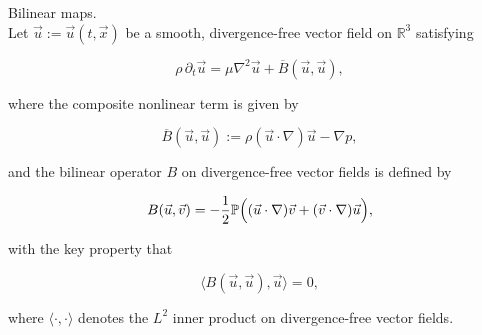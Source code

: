 \documentclass[12pt]{article}
\begin{document}
\begin{definition} Bilinear maps. \\ 
Let \(\vec{u} := \vec{u}(t,\vec{x})\) be a smooth, divergence-free vector field on \(\mathbb{R}^3\) satisfying

  \[
  \rho\, \partial_{t}\vec{u} = \mu \nabla^2 \vec{u} + \overline{B}(\vec{u}, \vec{u}),
  \]
  
  where the composite nonlinear term is given by
  
  \[
  \overline{B}(\vec{u}, \vec{u}) := \rho (\vec{u}\cdot\nabla)\vec{u} - \nabla p,
  \]
  
  and the bilinear operator \(B\) on divergence-free vector fields is defined by
  
  \[
  B(\vec{u}, \vec{v}) = -\frac{1}{2} \mathbb{P}\Bigl((\vec{u}\cdot\nabla)\vec{v} + (\vec{v}\cdot\nabla)\vec{u}\Bigr),
  \]
  
  with the key property that
  
  \[
  \langle B(\vec{u}, \vec{u}), \vec{u} \rangle = 0,
  \]
  
  where \(\langle \cdot, \cdot \rangle\) denotes the \(L^2\) inner product on divergence-free vector fields. \\    
\end{definition}
\end{document}
